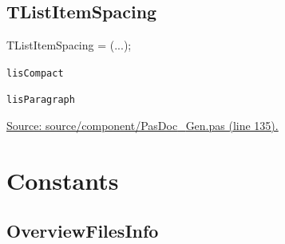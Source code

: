 \documentclass{report}
\newif\ifpdf
\begin{document}
\subsection*{TListItemSpacing}
\fi
\label{PasDoc_Gen-TListItemSpacing}
\begin{list}{}{
\setlength{\itemindent}{0cm}
\setlength{\listparindent}{0cm}
\setlength{\leftmargin}{\evensidemargin}
\addtolength{\leftmargin}{\tmplength}
\settowidth{\labelsep}{X}
\addtolength{\leftmargin}{\labelsep}
\setlength{\labelwidth}{\tmplength}
}
\item[\textbf{Declaration}\hfill]
\ifpdf
\begin{flushleft}
\fi
\begin{ttfamily}
TListItemSpacing = (...);\end{ttfamily}

\ifpdf
\end{flushleft}
\fi

\par
\item[\textbf{Description}]
 \item[\textbf{Values}]
\begin{description}
\item[\texttt{lisCompact}] \label{PasDoc_Gen-lisCompact}
\index{}
 
\item[\texttt{lisParagraph}] \label{PasDoc_Gen-lisParagraph}
\index{}
 
\end{description}
\par
\href{https://github.com/pasdoc/pasdoc/blob/master/source/component/PasDoc_Gen.pas#L135}{Source: source/component/PasDoc{\_}Gen.pas (line 135).}

\end{list}
\section{Constants}
\ifpdf
\subsection*{\large{\textbf{OverviewFilesInfo}}\normalsize\hspace{1ex}\hrulefill}
\else
\end{document}
